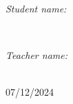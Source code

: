 \begin{titlepage}
    \begin{minipage}[t]{0.4\textwidth}
    \begin{flushleft} \large
    \emph{Student name: }\\
    \studentname
    \end{flushleft}
    \end{minipage}
    ~
    \begin{minipage}[t]{0.4\textwidth}
    \begin{flushright} \Large
    \emph{Teacher name: } \\
    \teachername
    \end{flushright}
    \end{minipage} \\[4.2cm]
    {\large 07/12/2024} \\[0.4cm]
    \vfill
    
\end{titlepage}